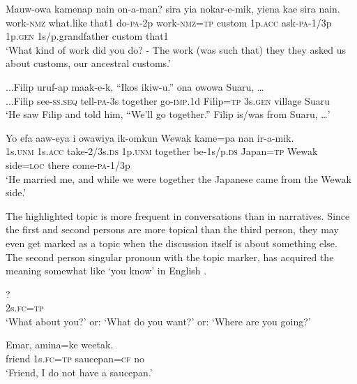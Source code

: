 \ea%
\label{ex:9:x1680}
\gll Mauw-owa  kamenap  nain  on-a-man?   sira  yia  nokar-e-mik,  yiena  kae  sira nain.\\
work-\textsc{nmz}  what.like  that1  do-\textsc{pa}-2p  work-\textsc{nmz}=\textsc{tp} custom  1p.\textsc{acc}  ask-\textsc{pa}-1/3p  1p.\textsc{gen}  1s/p.grandfather  custom that1    \\
\glt`What kind of work did you do? - The work (was such that) they they asked us about customs, our ancestral customs.'
\z


\ea%
\label{ex:9:x1678}
\gll ...Filip  uruf-ap  maak-e-k,  ``Ikos  ikiw-u.''   ona  owowa  Suaru,  {\dots}\\
...Filip  see-\textsc{ss}.\textsc{seq}  tell-\textsc{pa}-3s  together  go-\textsc{imp}.1d  Filip=\textsc{tp} 3s.\textsc{gen}  village  Suaru     \\
\glt`He saw Filip and told him, ``We'll go together.'' Filip is/was from Suaru, {\dots}'
\z


\ea%
\label{ex:9:x1679}
\gll Yo  efa  aaw-eya  i  owawiya  ik-omkun   Wewak  kame=pa  nan  ir-a-mik. \\
1s.\textsc{unm}  1s.\textsc{acc}  take-2/3s.\textsc{ds}  1p.\textsc{unm}  together  be-1s/p.\textsc{ds} Japan=\textsc{tp}  Wewak  side=\textsc{loc}  there  come-\textsc{pa}-1/3p     \\
\glt`He married me, and while we were together the Japanese came from the Wewak side.'
\z


The highlighted topic is more frequent in conversations than in narratives. Since the first and second persons are more topical than the third person, they may even get marked as a topic when the discussion itself is about something else. The second person singular pronoun with the topic marker,  has acquired the meaning somewhat like `you know' in English .

\ea%
\label{ex:9:x1684}
\gll {}? \\
2s.\textsc{fc}=\textsc{tp}      \\
\glt`What about you?' or: `What do you want?' or: `Where are you going?'
\z


\ea%
\label{ex:9:x1685}
\gll Emar,    amina=ke  weetak. \\
friend  1s.\textsc{fc}=\textsc{tp}  saucepan=\textsc{cf}  no      \\
\glt`Friend, I do not have a saucepan.'
\z


